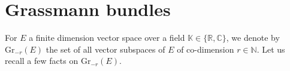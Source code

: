 \documentclass[10pt]{article}
\theoremstyle{plain}
\theoremstyle{definition}
\theoremstyle{remark}
\begin{document}
    



\appendix
\section{Grassmann bundles}\label{appendix}
For $E$ a finite dimension vector space over a field $\mathbb{K}\in \{\mathbb{R}, \mathbb{C}\}$, we denote by 
 $\mathrm{Gr}_{-r}(E)$ the set of all  vector subspaces of $E$ of co-dimension $r\in \mathbb N$. Let us recall a few facts on $\mathrm{Gr}_{-r}(E)$.
\end{document}
